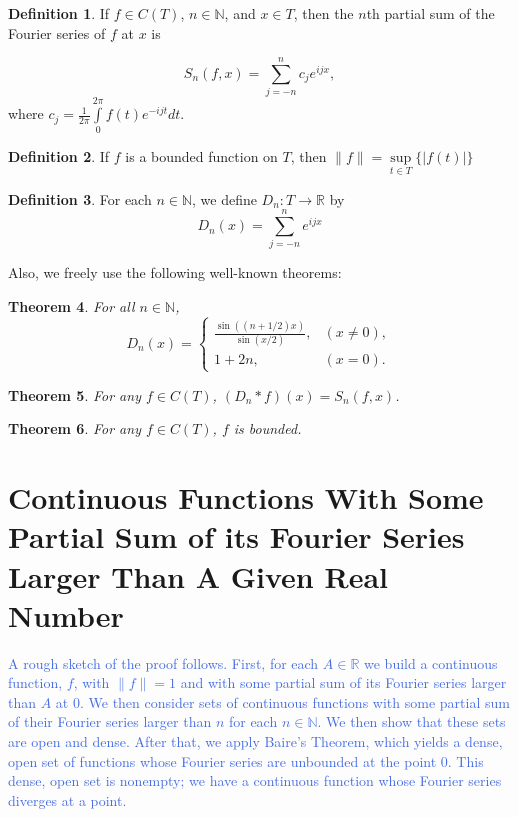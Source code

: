 \documentclass{amsart}
\newcommand{\N}{\mathbb{N}}
\newcommand{\R}{\mathbb{R}}
\newcommand{\colorcomment}[2]{\textcolor{#1}{#2}} %
\newcommand{\absval}[1]{\left| #1 \right|}
\newcommand{\norm}[1]{\|#1\|}
\newtheorem{thm}{Theorem}[section]
\theoremstyle{definition}
\newtheorem{definition}[thm]{Definition}
\begin{document}
\begin{definition}
If $f \in C(T)$, $n \in \N$, and $x \in T$, then the $n$th partial sum of the Fourier series of $f$ at $x$ is 

\begin{displaymath}
S_n(f,x) = \sum\limits_{j=-n}^n c_j e^{ijx},
\end{displaymath}
where $c_j = \frac{1}{2 \pi} \int\limits_0^{2\pi} f(t)e^{-ijt} dt$.
\end{definition}

\begin{definition}
If $f$ is a bounded function on $T$, then $\norm{f} = \sup\limits_{t \in T} \{\absval{f(t)}\}$
\end{definition}

\begin{definition}
For each $n \in \N$, we define $D_n: T \to \R$ by
\begin{displaymath}
   D_n(x) = \sum\limits_{j=-n}^n e^{ijx}
\end{displaymath} 
\end{definition}

Also, we freely use the following well-known theorems:

\begin{thm}
For all $n \in \N$, 
\begin{displaymath}
   D_n(x) = \left\{
     \begin{array}{lr}
       \frac{\sin((n+1/2)x)}{\sin(x/2)}, &(x \neq 0),\\
       1+2n, &(x=0).
     \end{array}
   \right.
\end{displaymath}
\end{thm}

\begin{thm}
For any $f \in C(T)$, $(D_n \ast f)(x) = S_n(f,x)$. 
\end{thm}

\begin{thm}
For any $f \in C(T)$, $f$ is bounded.
\end{thm}

\section{Continuous Functions With Some Partial Sum of its Fourier Series Larger Than A Given Real Number}

\colorcomment{RoyalBlue}{A rough sketch of the proof follows. 
First, for each $A \in \R$ we build a continuous function, $f$, with $\norm{f} = 1$ and with some partial sum of its Fourier series larger than $A$ at $0$. 
We then consider sets of continuous functions with some partial sum of their Fourier series larger than $n$ for each $n \in \N$.
We then show that these sets are open and dense. 
After that, we apply Baire's Theorem, which yields a dense, open set of functions whose Fourier series are unbounded at the point $0$. 
This dense, open set is nonempty; we have a continuous function whose Fourier series diverges at a point.}
\end{document}
